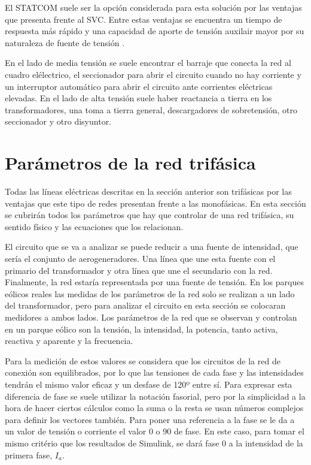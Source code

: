 \documentclass{book}
\begin{document}
El STATCOM suele ser la opci\'on considerada para esta soluci\'on por las ventajas que presenta frente al SVC. Entre estas ventajas se encuentra un tiempo de respuesta m\'as r\'apido y una capacidad de aporte de tensi\'on auxilair mayor por su naturaleza de fuente de tensi\'on \cite{STATCOM}. \par

En el lado de media tensi\'on se suele encontrar el barraje que conecta la red al cuadro el\'electrico, el seccionador para abrir el circuito cuando no hay corriente y un interruptor autom\'atico para abrir el circuito ante corrientes el\'ectricas elevadas. En el lado de alta tensi\'on suele haber reactancia a tierra en los transformadores, una toma a tierra general, descargadores de sobretensi\'on, otro seccionador y otro disyuntor.  \par


	\section{Par\'ametros de la red trif\'asica} 
	
	Todas las l\'ineas el\'ectricas descritas en la secci\'on anterior son trif\'asicas por las ventajas que este tipo de redes presentan frente a las monof\'asicas. En esta secci\'on se cubrir\'an todos los par\'ametros que hay que controlar de una red trif\'asica, su sentido f\'isico y las ecuaciones que los relacionan. \par

El circuito que se va a analizar se puede reducir a una fuente de intensidad, que ser\'ia el conjunto de aerogeneradores. Una l\'inea que une esta fuente con el primario del transformador y otra l\'inea que une el secundario con la red. Finalmente, la red estar\'ia representada por una fuente de tensi\'on. En los parques e\'olicos reales las medidas de los par\'ametros de la red solo se realizan a un lado del transformador, pero para analizar el circuito en esta secci\'on se colocaran medidores a ambos lados. Los par\'ametros de la red que se observan y controlan en un parque e\'olico son la tensi\'on, la intensidad, la potencia, tanto activa, reactiva y aparente y la frecuencia. \par

Para la medici\'on de estos valores se considera que los circuitos de la red de conexi\'on son equilibrados, por lo que las tensiones de cada fase y las intensidades tendr\'an el mismo valor eficaz y un desfase de 120º entre s\'i. Para expresar esta diferencia de fase se suele utilizar la notaci\'on fasorial,  pero por la simplicidad a la hora de hacer ciertos c\'alculos como la suma o la resta se usan n\'umeros complejos para definir los vectores tambi\'en. Para poner una referencia a la fase se le da a un valor de tensi\'on o corriente el valor 0 o 90 de fase. En este caso, para tomar el mismo crit\'erio que los resultados de Simulink, se dar\'a fase 0 a la intensidad de la primera fase, $I_a$. \par
\end{document}
